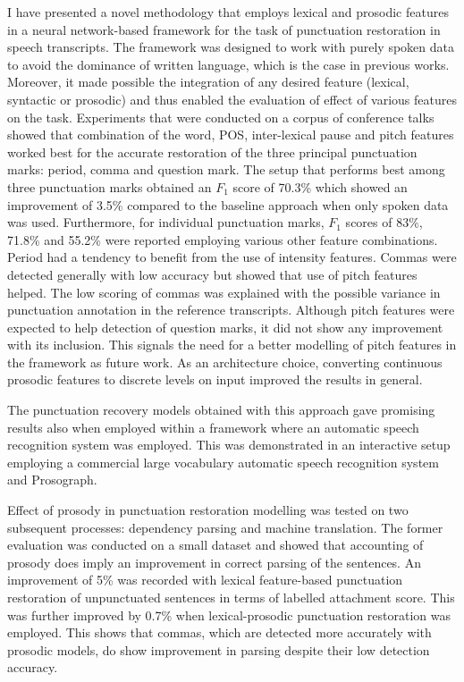 I have presented a novel methodology that employs lexical and prosodic features in a neural network-based framework for the task of punctuation restoration in speech transcripts. The framework was designed to work with purely spoken data to avoid the dominance of written language, which is the case in previous works. Moreover, it made possible the integration of any desired feature (lexical, syntactic or prosodic) and thus enabled the evaluation of effect of various features on the task. Experiments that were conducted on a corpus of conference talks showed that combination of the word, POS, inter-lexical pause and pitch features worked best for the accurate restoration of the three principal punctuation marks: period, comma and question mark. The setup that performs best among three punctuation marks obtained an $F_1$ score of 70.3\% which showed an improvement of 3.5\% compared to the baseline approach when only spoken data was used. Furthermore, for individual punctuation marks, $F_1$ scores of 83\%, 71.8\% and 55.2\% were reported employing various other feature combinations. Period had a tendency to benefit from the use of intensity features. Commas were detected generally with low accuracy but showed that use of pitch features helped. The low scoring of commas was explained with the possible variance in punctuation annotation in the reference transcripts. Although pitch features were expected to help detection of question marks, it did not show any improvement with its inclusion. This signals the need for a better modelling of pitch features in the framework as future work. As an architecture choice, converting continuous prosodic features to discrete levels on input improved the results in general. 

The punctuation recovery models obtained with this approach gave promising results also when employed within a framework where an automatic speech recognition system was employed. This was demonstrated in an interactive setup employing a commercial large vocabulary automatic speech recognition system and Prosograph.

Effect of prosody in punctuation restoration modelling was tested on two subsequent processes: dependency parsing and machine translation. The former evaluation was conducted on a small dataset and showed that accounting of prosody does imply an improvement in correct parsing of the sentences. An improvement of 5\% was recorded with lexical feature-based punctuation restoration of unpunctuated sentences in terms of labelled attachment score. This was further improved by 0.7\% when lexical-prosodic punctuation restoration was employed. This shows that commas, which are detected more accurately with prosodic models, do show improvement in parsing despite their low detection accuracy. 

